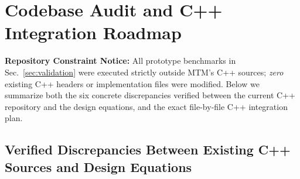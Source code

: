 \documentclass[11pt,a4paper]{article}
\begin{document}
\section{Codebase Audit and C++ Integration Roadmap}
\label{sec:code_map}

\textbf{Repository Constraint Notice:} All prototype benchmarks in Sec.~\ref{sec:validation} were executed strictly outside MTM's C++ sources; \emph{zero} existing C++ headers or implementation files were modified. Below we summarize both the six concrete discrepancies verified between the current C++ repository and the design equations, and the exact file-by-file C++ integration plan.

\subsection{Verified Discrepancies Between Existing C++ Sources and Design Equations}
\label{subsec:cpp_discrepancies}
\end{document}
